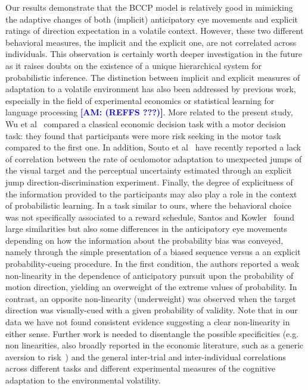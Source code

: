 \documentclass[10pt,letterpaper]{article}
\newcommand{\citep}[1]{\cite{#1}}
\newcommand{\citet}[1]{\cite{#1}}
\newcommand{\AM}[1]{\textbf{\textcolor{blue}{[AM: #1]}}}
\begin{document}
Our results demonstrate that the BCCP model is relatively good in mimicking the adaptive changes of both (implicit) anticipatory eye movements and explicit ratings of direction expectation in a volatile context. However, these two different behavioral measures, the implicit and the explicit one, are not correlated across individuals. This observation is certainly worth deeper investigation in the future as it raises doubts on the existence of a unique hierarchical system for probabilistic inference. The distinction between implicit and explicit measures of adaptation to a volatile environment has also been addressed by previous work, especially in the field of experimental economics or statistical learning for language processing \AM{(REFFS ???)}. More related to the present study, Wu et al~\citet{WuDelgadoMaloney2012} compared a classical economic decision task with a motor decision task: they found that participants were more risk seeking in the motor task compared to the first one. In addition, Souto et al~\citet{SoutoGegenfurtnerSchuetz2016} have recently reported a lack of correlation between the rate of oculomotor adaptation to unexpected jumps of the visual target and the perceptual uncertainty estimated through an explicit jump direction-discrimination experiment. Finally, the degree of explicitness of the information provided to the participants may also play a role in the context of probabilistic learning. In a task similar to ours, where the behavioral choice was not specifically associated to a reward schedule, Santos and Kowler~\citet{SantosKowler2017} found large similarities but also some differences in the anticipatory eye movements depending on how the information about the probability bias was conveyed, namely through the simple presentation of a biased sequence versus a an explicit probability-cueing procedure. In the first condition, the authors reported a weak non-linearity in the dependence of anticipatory pursuit upon the probability of motion direction, yielding an overweight of the extreme values of probability. In contrast, an opposite non-linearity (underweight) was observed when the target direction was visually-cued with a given probability of validity. Note that in our data we have not found consistent evidence suggesting a clear non-linearity in either sense. Further work is needed to disentangle the possible specificities (e.g. non linearities, also broadly reported in the economic literature, such as a generic aversion to risk~\citep{Kahneman13}) and the general inter-trial and inter-individual correlations across different tasks and different experimental measures of the cognitive adaptation to the environmental volatility.
\end{document}
